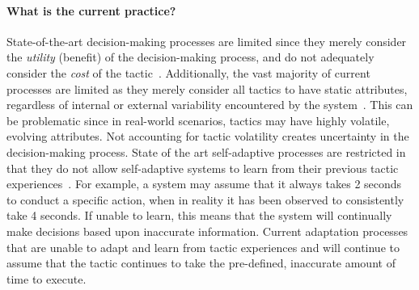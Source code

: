\documentclass[12pt]{article}
\begin{document}
\vspace{-3mm}\paragraph{What is the current practice?} State-of-the-art decision-making processes are limited since they merely consider the \emph{utility} (benefit) of the decision-making process, and do not adequately consider the \emph{cost} of the tactic~\cite{Donckt-Cost}. Additionally, the vast majority of current processes are limited as they merely consider all tactics to have static attributes, regardless of internal or external variability encountered by the system~\cite{moreno2015proactive, Moreno:2017:CMP:3105503.3105511}. This can be problematic since in real-world scenarios, tactics may have highly volatile, evolving attributes. Not accounting for tactic volatility creates uncertainty in the decision-making process. State of the art self-adaptive processes are restricted in that they do not allow self-adaptive systems to learn from their previous tactic experiences~\cite{camara2016analyzing, moreno2017adaptation}. For example, a system may assume that it always takes 2 seconds to conduct a specific action, when in reality it has been observed to consistently take 4 seconds. If unable to learn, this means that the system will continually make decisions based upon inaccurate information. Current adaptation processes that are unable to adapt and learn from tactic experiences and will continue to assume that the tactic continues to take the pre-defined, inaccurate amount of time to execute. %
\end{document}
